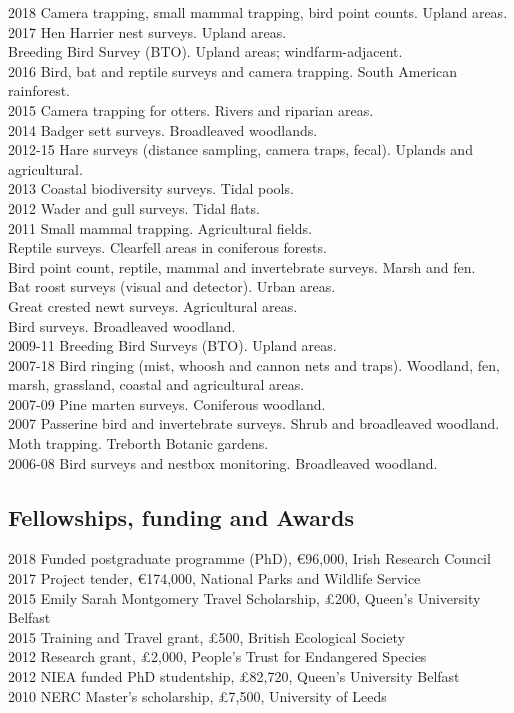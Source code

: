 \documentclass[]{article}
\newcommand{\euro}{€}
\begin{document}
2018 Camera trapping, small mammal trapping, bird point counts. Upland
areas.\\
2017 Hen Harrier nest surveys. Upland areas.\\
Breeding Bird Survey (BTO). Upland areas; windfarm-adjacent.\\
2016 Bird, bat and reptile surveys and camera trapping. South American
rainforest.\\
2015 Camera trapping for otters. Rivers and riparian areas.\\
2014 Badger sett surveys. Broadleaved woodlands.\\
2012-15 Hare surveys (distance sampling, camera traps, fecal). Uplands
and agricultural.\\
2013 Coastal biodiversity surveys. Tidal pools.\\
2012 Wader and gull surveys. Tidal flats.\\
2011 Small mammal trapping. Agricultural fields.\\
Reptile surveys. Clearfell areas in coniferous forests.\\
Bird point count, reptile, mammal and invertebrate surveys. Marsh and
fen.\\
Bat roost surveys (visual and detector). Urban areas.\\
Great crested newt surveys. Agricultural areas.\\
Bird surveys. Broadleaved woodland.\\
2009-11 Breeding Bird Surveys (BTO). Upland areas.\\
2007-18 Bird ringing (mist, whoosh and cannon nets and traps). Woodland,
fen, marsh, grassland, coastal and agricultural areas.\\
2007-09 Pine marten surveys. Coniferous woodland.\\
2007 Passerine bird and invertebrate surveys. Shrub and broadleaved
woodland.\\
Moth trapping. Treborth Botanic gardens.\\
2006-08 Bird surveys and nestbox monitoring. Broadleaved woodland.

\subsection{Fellowships, funding and
Awards}\label{fellowships-funding-and-awards}

2018 Funded postgraduate programme (PhD), \euro{}96,000, Irish Research
Council\\
2017 Project tender, \euro{}174,000, National Parks and Wildlife
Service\\
2015 Emily Sarah Montgomery Travel Scholarship, £200, Queen's University
Belfast\\
2015 Training and Travel grant, £500, British Ecological Society\\
2012 Research grant, £2,000, People's Trust for Endangered Species\\
2012 NIEA funded PhD studentship, £82,720, Queen's University Belfast\\
2010 NERC Master's scholarship, £7,500, University of Leeds
\end{document}
